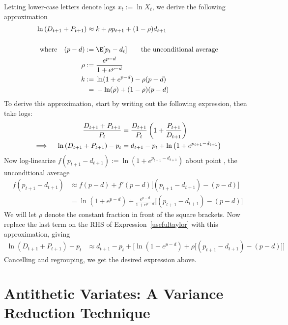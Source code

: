 \documentclass[12pt]{article}
\theoremstyle{plain}
\theoremstyle{definition}
\theoremstyle{remark}
\begin{document}
Letting lower-case letters denote logs $x_t:=\ln X_t$, we derive
the following approximation
\begin{align*}
  \ln\left(D_{t+1}+P_{t+1}\right)
  \approx&\;
  k + \rho p_{t+1} + (1-\rho)d_{t+1}
  \\
  \\
  \text{where}\quad
  (p-d):=&\;\E[p_t-d_t] \qquad\text{the unconditional average} \\
  \rho :=&\; \frac{e^{p-d}}{1+e^{p-d}} \\
  k
  :=&\; \ln(1+e^{p-d}) - \rho(p-d)
  \\
  =&\; -\ln(\rho) + (1-\rho)(p-d)
\end{align*}
To derive this approximation, start by writing out the following
expression, then take logs:
\begin{align}
  \frac{D_{t+1}+P_{t+1}}{P_t}
  &=
  \frac{D_{t+1}}{P_t}
  \left(
  1+
  \frac{P_{t+1}}{D_{t+1}}
  \right)
  \notag
  \\
  \implies\quad
  \ln\left(D_{t+1}+P_{t+1}\right)
  - p_t
  &=
  d_{t+1}-p_t
  +
  \ln
  \left(
  1+e^{p_{t+1}-d_{t+1}}
  \right)
  \label{usefultaylor}
\end{align}
Now log-linearize $f(p_{t+1}-d_{t+1}):=\ln(1+e^{p_{t+1}-d_{t+1}})$
about point , the unconditional average
\begin{align*}
  f(p_{t+1}-d_{t+1})
  &\approx
  f(p-d) + f'(p-d)\big[(p_{t+1}-d_{t+1})-(p-d)\big]
  \\
  &=
  \ln(1+e^{p-d})
  +
  \frac{e^{p-d}}{1+e^{p-d}}
  \big[(p_{t+1}-d_{t+1})-(p-d)\big]
\end{align*}
We will let $\rho$ denote the constant fraction in front of the square
brackets.
Now replace the last term on the RHS of Expression~\ref{usefultaylor}
with this approximation, giving
\begin{align*}
  \ln\left(D_{t+1}+P_{t+1}\right)
  - p_t
  &\approx
  d_{t+1}-p_t
  +
  \big[
  \ln(1+e^{p-d})
  +
  \rho
  \big[(p_{t+1}-d_{t+1})-(p-d)\big]
  \big]
\end{align*}
Cancelling and regrouping, we get the desired expression above.


\section{Antithetic Variates: A Variance Reduction Technique}
\end{document}
